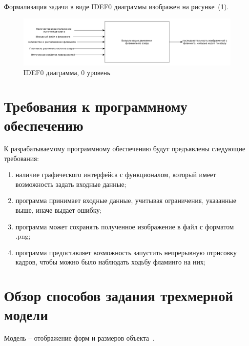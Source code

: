 Формализация задачи в виде IDEF0 диаграммы изображен на рисунке~(\ref{fig:idef0}).

\begin{figure}[h!]
	\centering
	\includegraphics[width=\linewidth]{img/idef0}
	\caption{IDEF0 диаграмма, 0 уровень}
	\label{fig:idef0}
\end{figure}

\section{Требования к программному \\
	обеспечению}

К разрабатываемому программному обеспечению будут предъявлены следующие требования:
\begin{enumerate}[label=\arabic*)]
	\item наличие графического интерфейса с функционалом, который имеет возможность задать входные данные;
	\item программа принимает входные данные, учитывая ограничения, указанные выше, иначе выдает ошибку;
	\item программа может сохранять полученное изображение в файл с форматом .png;
	\item программа предоставляет возможность запустить непрерывную отрисовку кадров, чтобы можно было наблюдать ходьбу фламинго на них;
\end{enumerate} 

\section{Обзор способов задания трехмерной модели}

Модель – отображение форм и размеров объекта~\cite{kurov}.

